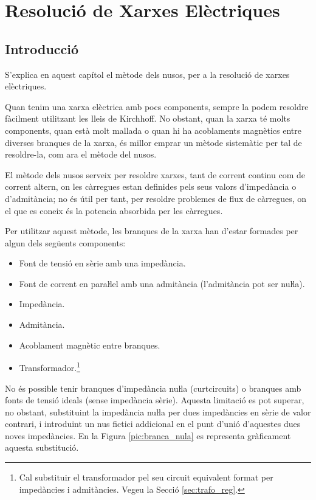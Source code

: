 \chapter{Resolució de Xarxes Elèctriques} \label{chap:nusos}
\section{Introducció}
S'explica en aquest capítol el
mètode dels nusos, per a la resolució de xarxes elèctriques.

Quan tenim una xarxa elèctrica amb pocs components, sempre la podem resoldre fàcilment
utilitzant les lleis de Kirchhoff. No obstant, quan la xarxa té molts components, quan està
 molt mallada o quan hi ha acoblaments magnètics entre diverses branques de la xarxa, és millor
 emprar un mètode sistemàtic per tal de resoldre-la, com ara el mètode del nusos.

El mètode dels nusos serveix per resoldre xarxes, tant de corrent
continu com de corrent altern, on les càrregues estan definides pels
seus valors d'impedància o d'admitància; no és útil per tant, per
resoldre problemes de flux de càrregues, on el que es coneix és la
potencia absorbida per les càrregues.

Per utilitzar aquest mètode, les branques de la xarxa han d'estar
formades per algun dels següents components: \vspace{-1.5mm}
\begin{itemize}
   \item Font de tensió en sèrie amb una impedància.
   \item Font de corrent en paraŀlel amb una admitància (l'admitància pot ser nuŀla).
   \item Impedància.
   \item Admitància.
   \item Acoblament magnètic entre branques.
   \item Transformador.\footnote{Cal substituir el transformador pel seu circuit equivalent format per impedàncies i
   admitàncies. Vegeu la Secció \ref{sec:trafo_reg}.}
\end{itemize}
\vspace{-1.5mm}

No és possible tenir branques d'impedància nuŀla (curtcircuits) o
branques amb fonts de tensió ideals (sense impedància sèrie).
Aquesta limitació es pot superar, no obstant, substituint la
impedància nuŀla per dues impedàncies en sèrie  de valor
contrari, i introduint un nus fictici addicional en el punt d'unió
d'aquestes dues noves impedàncies. En la Figura
\vref{pic:branca_nula}
 es representa gràficament aquesta substitució. 
\begin{center}
   
    \label{pic:branca_nula}
\end{center}

